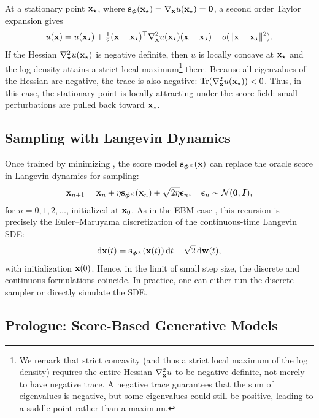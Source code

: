 At a stationary point ${\mathbf{x}}_\star$, where ${\mathbf{s}}_{\bm\phi}({\mathbf{x}}_\star)=\nabla_{{\mathbf{x}}}u({\mathbf{x}}_\star)=\mathbf{0}$,
a second order Taylor expansion gives
\[
u({\mathbf{x}})
= u({\mathbf{x}}_\star)
+ \tfrac12({\mathbf{x}}-{\mathbf{x}}_\star)^\top \nabla_{{\mathbf{x}}}^2 u({\mathbf{x}}_\star)({\mathbf{x}}-{\mathbf{x}}_\star)
+ o(\|{\mathbf{x}}-{\mathbf{x}}_\star\|^2).
\]
If the Hessian $\nabla_{{\mathbf{x}}}^2 u({\mathbf{x}}_\star)$ is negative definite, then $u$ is locally concave at
${\mathbf{x}}_\star$ and the log density attains a strict local maximum\footnote{We remark that strict concavity (and thus a strict local maximum of the log density) requires the entire Hessian
$\nabla_{{\mathbf{x}}}^2 u$ to be negative definite, not merely to have negative trace.
A negative trace guarantees that the sum of eigenvalues is negative, but some eigenvalues could still
be positive, leading to a saddle point rather than a maximum.
} there.
Because all eigenvalues of the Hessian are negative, the trace is also negative:
$\operatorname{Tr}(\nabla_{{\mathbf{x}}}^2 u({\mathbf{x}}_\star))<0$.
Thus, in this case, the stationary point is locally attracting under the score field:
small perturbations are pulled back toward ${\mathbf{x}}_\star$.






\subsection{Sampling with Langevin Dynamics}
Once trained by minimizing , the score model ${\mathbf{s}}_{\bm{\phi}^\times}({\mathbf{x}})$ can replace the oracle score in Langevin dynamics for sampling:
\begin{align}\label{eq:score-langevin-emp}
    \mathbf{x}_{n+1} = \mathbf{x}_n + \eta   {\mathbf{s}}_{\bm{\phi}^\times}({\mathbf{x}}_n) + \sqrt{2\eta}    \bm{\epsilon}_n, \quad \bm{\epsilon}_n \sim \mathcal{N}(\bm{0}, \bm{I}),
\end{align}
for $n=0,1,2,\dots$, initialized at ${\mathbf{x}}_0$. As in the EBM case , this recursion is precisely the Euler–Maruyama discretization of the continuous-time Langevin SDE:
\begin{align*}
    \mathop{}\!\mathrm{d} {\mathbf{x}}(t) = {\mathbf{s}}_{\bm{\phi}^\times}({\mathbf{x}}(t)) \mathop{}\!\mathrm{d} t + \sqrt{2} \mathop{}\!\mathrm{d} \mathbf{w}(t),
\end{align*}
with initialization ${\mathbf{x}}(0)$. Hence, in the limit of small step size, the discrete and continuous formulations coincide.  In practice, one can either run the discrete sampler or directly simulate the SDE.



\subsection{Prologue: Score-Based Generative Models}

